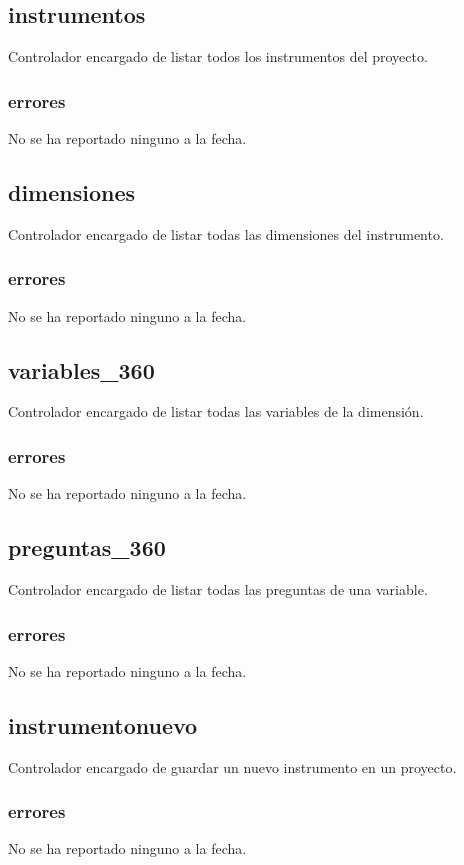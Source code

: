 \documentclass[10pt,a4paper]{book}
\begin{document}
	\subsection{instrumentos}
	Controlador encargado de listar todos los instrumentos del proyecto.
	\subsubsection{errores}
	No se ha reportado ninguno a la fecha.

	\subsection{dimensiones}
	Controlador encargado de listar todas las dimensiones del instrumento.
	\subsubsection{errores}
	No se ha reportado ninguno a la fecha.

	\subsection{variables\_360}
	Controlador encargado de listar todas las variables de la dimensión.
	\subsubsection{errores}
	No se ha reportado ninguno a la fecha.

	\subsection{preguntas\_360}
	Controlador encargado de listar todas las preguntas de una variable.
	\subsubsection{errores}
	No se ha reportado ninguno a la fecha.

	\subsection{instrumentonuevo}
	Controlador encargado de guardar un nuevo instrumento en un proyecto.
	\subsubsection{errores}
	No se ha reportado ninguno a la fecha.
\end{document}
